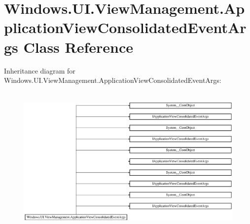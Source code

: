 \hypertarget{class_windows_1_1_u_i_1_1_view_management_1_1_application_view_consolidated_event_args}{}\section{Windows.\+U\+I.\+View\+Management.\+Application\+View\+Consolidated\+Event\+Args Class Reference}
\label{class_windows_1_1_u_i_1_1_view_management_1_1_application_view_consolidated_event_args}
Inheritance diagram for Windows.\+U\+I.\+View\+Management.\+Application\+View\+Consolidated\+Event\+Args\+:\begin{figure}[H]
\begin{center}
\leavevmode
\includegraphics[height=7.403846cm]{class_windows_1_1_u_i_1_1_view_management_1_1_application_view_consolidated_event_args}
\end{center}
\end{figure}
